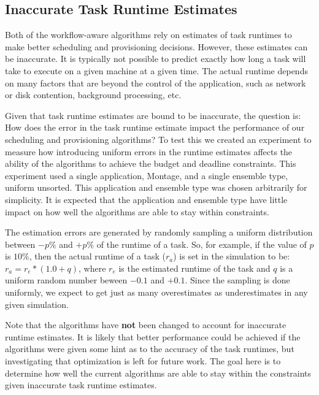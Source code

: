 \documentclass[conference]{IEEEtran}
\begin{document}
\subsection{Inaccurate Task Runtime Estimates}
\label{sec:variances}

Both of the workflow-aware algorithms rely on estimates of task runtimes to make better scheduling and provisioning decisions. However, these estimates can be inaccurate. It is typically not possible to predict exactly how long a task will take to execute on a given machine at a given time. The actual runtime depends on many factors that are beyond the control of the application, such as network or disk contention, background processing, etc.

Given that task runtime estimates are bound to be inaccurate, the question is: How does the error in the task runtime estimate impact the performance of our scheduling and provisioning algorithms? To test this we created an experiment to measure how introducing uniform errors in the runtime estimates affects the ability of the algorithms to achieve the budget and deadline constraints. This experiment used a single application, Montage, and a single ensemble type, uniform unsorted. This application and ensemble type was chosen arbitrarily for simplicity. It is expected that the application and ensemble type have little impact on how well the algorithms are able to stay within constraints.

The estimation errors are generated by randomly sampling a uniform distribution between $-p\%$ and $+p\%$ of the runtime of a task. So, for example, if the value of $p$ is $10\%$, then the actual runtime of a task ($r_a$) is set in the simulation to be: $r_a = r_e * (1.0 + q)$, where $r_e$ is the estimated runtime of the task and $q$ is a uniform random number beween $-0.1$ and $+0.1$. Since the sampling is done uniformly, we expect to get just as many overestimates as underestimates in any given simulation.

Note that the algorithms have \textbf{not} been changed to account for inaccurate runtime estimates. It is likely that better performance could be achieved if the algorithms were given some hint as to the accuracy of the task runtimes, but investigating that optimization is left for future work. The goal here is to determine how well the current algorithms are able to stay within the constraints given inaccurate task runtime estimates.
\end{document}

